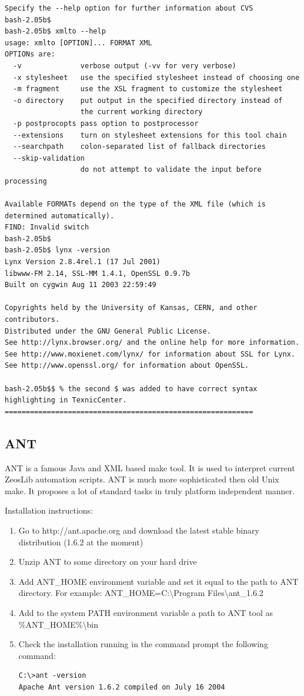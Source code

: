 \documentclass[a4paper,12pt,oneside]{book}
\begin{document}
\begin{enumerate}
\begin{verbatim}
Specify the --help option for further information about CVS
bash-2.05b$
bash-2.05b$ xmlto --help
usage: xmlto [OPTION]... FORMAT XML
OPTIONs are:
  -v              verbose output (-vv for very verbose)
  -x stylesheet   use the specified stylesheet instead of choosing one
  -m fragment     use the XSL fragment to customize the stylesheet
  -o directory    put output in the specified directory instead of
                  the current working directory
  -p postprocopts pass option to postprocessor
  --extensions    turn on stylesheet extensions for this tool chain
  --searchpath    colon-separated list of fallback directories
  --skip-validation
                  do not attempt to validate the input before processing

Available FORMATs depend on the type of the XML file (which is
determined automatically).
FIND: Invalid switch
bash-2.05b$
bash-2.05b$ lynx -version
Lynx Version 2.8.4rel.1 (17 Jul 2001)
libwww-FM 2.14, SSL-MM 1.4.1, OpenSSL 0.9.7b
Built on cygwin Aug 11 2003 22:59:49

Copyrights held by the University of Kansas, CERN, and other contributors.
Distributed under the GNU General Public License.
See http://lynx.browser.org/ and the online help for more information.
See http://www.moxienet.com/lynx/ for information about SSL for Lynx.
See http://www.openssl.org/ for information about OpenSSL.

bash-2.05b$$ % the second $ was added to have correct syntax highlighting in TexnicCenter.
===========================================================
    \end{verbatim}
\end{enumerate}

\subsection{ANT}

ANT is a famous Java and XML based make tool.
It is used to interpret current ZeosLib automation scripts.
ANT is much more sophisticated then old Unix make.
It proposes a lot of standard tasks in truly platform independent manner.

Installation instructions:
\begin{enumerate}
  \item Go to http://ant.apache.org and download the latest stable binary distribution (1.6.2 at the moment)
	\item Unzip ANT to some directory on your hard drive
	\item
	  Add ANT\_HOME environment variable and set it equal to the path to ANT directory.
		For example: ANT\_HOME=C:\textbackslash Program Files\textbackslash ant\_1.6.2
	\item Add to the system PATH environment variable a path to ANT tool as \%ANT\_HOME\%\textbackslash bin
	\item Check the installation running in the command prompt the following command:
	  \begin{verbatim}
C:\>ant -version
Apache Ant version 1.6.2 compiled on July 16 2004
    \end{verbatim}
\end{enumerate}
\end{document}
